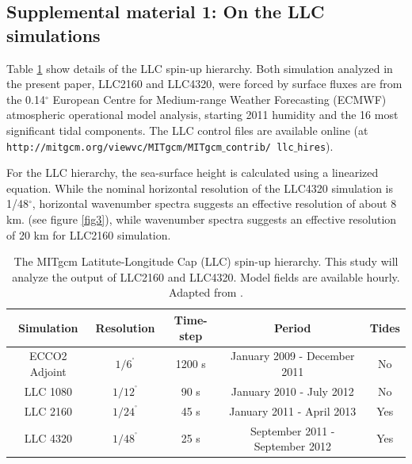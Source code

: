 \documentclass[grl]{agutex2015}
\begin{document}
\begin{article}







\newpage
\section*{Supplemental material 1: On the LLC simulations}

Table \ref{tab:llc} show details of the LLC spin-up hierarchy.
Both simulation analyzed in the present paper, LLC2160 and LLC4320,
were forced by surface fluxes are from the 0.14$^\circ$ European Centre for
Medium-range Weather Forecasting (ECMWF) atmospheric operational model analysis,
 starting 2011 humidity and the 16 most significant  tidal components.
The LLC control files are available online
(at \texttt{http://mitgcm.org/viewvc/MITgcm/MITgcm$\_$contrib/
llc$\_$hires}).

For the LLC hierarchy, the sea-surface height is calculated
using a linearized equation. While the nominal horizontal resolution  of the
LLC4320 simulation is 1/48$^\circ$,
horizontal wavenumber spectra suggests an effective resolution of about 8 km.
(see figure \ref{fig3}), while wavenumber spectra suggests an effective resolution
of 20 km for  LLC2160 simulation.

\begin{table}[ht]
\label{tab:llc}
\caption{\small The MITgcm Latitute-Longitude Cap (LLC) spin-up hierarchy. This study will analyze
         the output of LLC2160 and LLC4320. Model fields are available hourly.
         Adapted from \cite{rocha_etal2016}.}
\begin{center}
\begin{tabular}{ | c | c | c | c | c |}
\hline
Simulation & Resolution & Time-step & Period  & Tides \\ \hline
ECCO2 Adjoint & $1/6^{^\circ}$ & 1200 s & January 2009 - December 2011 & No\\
LLC 1080   & $1/12^{^\circ}$ & 90 s & January 2010 - July 2012 & No\\
LLC 2160   &  $1/24^{^\circ}$ & 45 s  & January 2011 - April 2013 & Yes\\
LLC 4320   &  $1/48^{^\circ}$ & 25 s & September 2011 - September 2012 & Yes \\
\hline
\end{tabular}
\end{center}
\end{table}


\end{article}
\end{document}
